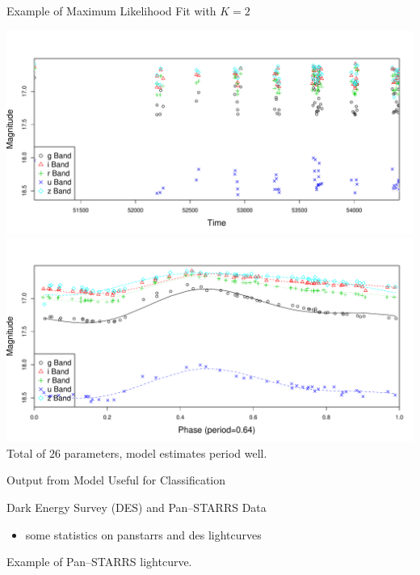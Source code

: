 \documentclass[12pt]{beamer}
\begin{document}
\begin{frame}{Example of Maximum Likelihood Fit with $K=2$}

\vspace{-.1in}

\begin{center}
\includegraphics[scale=.25]{figs/rrlyrae_nomodel_fit.pdf}\\
\includegraphics[scale=.25]{figs/rrlyrae_model_fit.pdf}\\
Total of $26$ parameters, model estimates period well.
\end{center}

\end{frame}

\begin{frame}{Output from Model Useful for Classification}


\end{frame}


\begin{frame}{Dark Energy Survey (DES) and Pan--STARRS Data}

\begin{itemize}
\item some statistics on panstarrs and des lightcurves
\end{itemize}

Example of Pan--STARRS lightcurve.

\end{frame}
\end{document}
